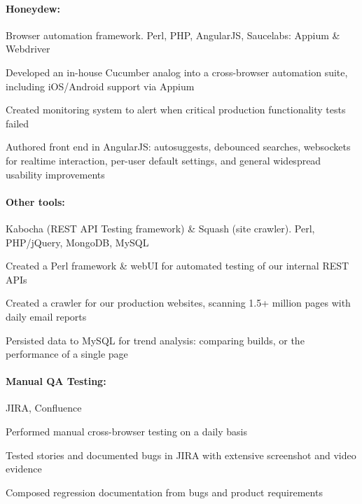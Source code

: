 \begin{position}

  \paragraph{Honeydew:} Browser automation framework. Perl, PHP, AngularJS, Saucelabs: Appium \& Webdriver
  \begin{myitem}
  \item Developed an in-house Cucumber analog into a cross-browser automation suite, including iOS/Android support via Appium
  \item Created monitoring system to alert when critical production functionality tests failed
  \item Authored front end in AngularJS: autosuggests, debounced searches, websockets for realtime interaction, per-user default settings, and general widespread usability improvements
  \end{myitem}
  \paragraph{Other tools:} Kabocha (REST API Testing framework) \& Squash (site crawler). Perl, PHP/jQuery, MongoDB, MySQL
  \begin{myitem}
  \item Created a Perl framework \& webUI for automated testing of our internal REST APIs
  \item Created a crawler for our production websites, scanning 1.5+ million pages with daily email reports
  \item Persisted data to MySQL for trend analysis: comparing builds, or the performance of a single page
  \end{myitem}
  \paragraph{Manual QA Testing:} JIRA, Confluence
  \begin{myitem}
  \item Performed manual cross-browser testing on a daily basis
  \item Tested stories and documented bugs in JIRA with extensive screenshot and video evidence
  \item Composed regression documentation from bugs and product requirements
  \end{myitem}
\end{position}
%
